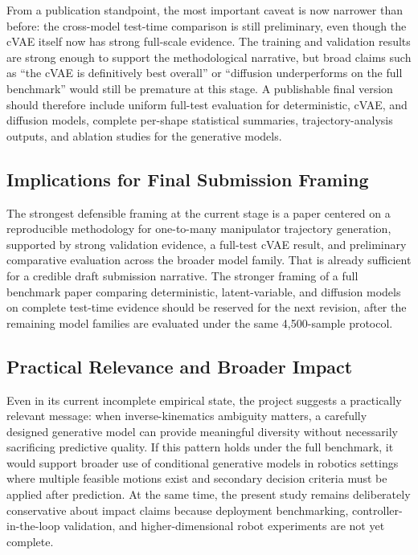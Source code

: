 \documentclass[11pt]{article}
\begin{document}
From a publication standpoint, the most important caveat is now narrower than before: the cross-model test-time comparison is still preliminary, even though the cVAE itself now has strong full-scale evidence. The training and validation results are strong enough to support the methodological narrative, but broad claims such as ``the cVAE is definitively best overall'' or ``diffusion underperforms on the full benchmark'' would still be premature at this stage. A publishable final version should therefore include uniform full-test evaluation for deterministic, cVAE, and diffusion models, complete per-shape statistical summaries, trajectory-analysis outputs, and ablation studies for the generative models.

\subsection{Implications for Final Submission Framing}

The strongest defensible framing at the current stage is a paper centered on a reproducible methodology for one-to-many manipulator trajectory generation, supported by strong validation evidence, a full-test cVAE result, and preliminary comparative evaluation across the broader model family. That is already sufficient for a credible draft submission narrative. The stronger framing of a full benchmark paper comparing deterministic, latent-variable, and diffusion models on complete test-time evidence should be reserved for the next revision, after the remaining model families are evaluated under the same 4,500-sample protocol.

\subsection{Practical Relevance and Broader Impact}

Even in its current incomplete empirical state, the project suggests a practically relevant message: when inverse-kinematics ambiguity matters, a carefully designed generative model can provide meaningful diversity without necessarily sacrificing predictive quality. If this pattern holds under the full benchmark, it would support broader use of conditional generative models in robotics settings where multiple feasible motions exist and secondary decision criteria must be applied after prediction. At the same time, the present study remains deliberately conservative about impact claims because deployment benchmarking, controller-in-the-loop validation, and higher-dimensional robot experiments are not yet complete.
\end{document}
